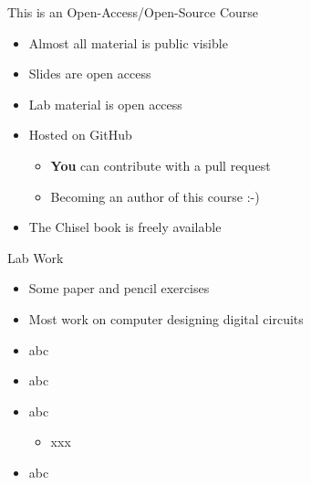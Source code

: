 \documentclass[xcolor=pdflatex,dvipsnames,table]{beamer}
\begin{document}
\begin{frame}[fragile]{This is an Open-Access/Open-Source Course}
\begin{itemize}
\item Almost all material is public visible
\item Slides are open access
\item Lab material is open access
\item Hosted on GitHub
\begin{itemize}
\item \textbf{You} can contribute with a pull request
\item Becoming an author of this course :-)
\end{itemize}
\item The Chisel book is freely available
\end{itemize}
\end{frame}

\begin{frame}[fragile]{Lab Work}
\begin{itemize}
\item Some paper and pencil exercises
\item Most work on computer designing digital circuits
\item abc
\item abc
\item abc
\begin{itemize}
\item xxx
\end{itemize}
\item abc
\end{itemize}
\end{frame}
\end{document}
